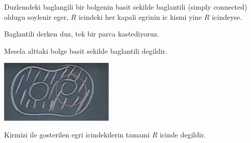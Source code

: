 \documentclass[12pt,fleqn]{article}\usepackage{../common}
\begin{document}
Duzlemdeki baglangili bir bolgenin basit sekilde baglantili (simply
connected) oldugu soylenir eger, $R$ icindeki her kapali egrinin ic kismi
yine $R$ icindeyse. 

Baglantili derken duz, tek bir parca kastediyoruz.

Mesela alttaki bolge basit sekilde baglantili degildir. 

\includegraphics[height=3cm]{24_7.png}

Kirmizi ile gosterilen egri icindekilerin tamami $R$ icinde degildir. 
\end{document}

